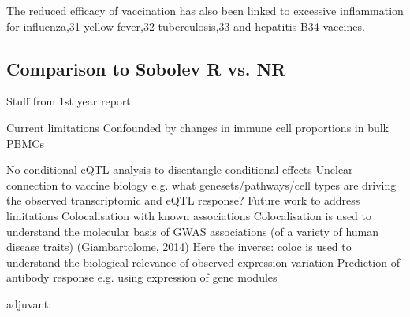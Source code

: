 The reduced efficacy of vaccination has also been linked to excessive inflammation for influenza,31 yellow fever,32 tuberculosis,33 and hepatitis B34 vaccines.

\subsection{Comparison to Sobolev R vs. NR}

Stuff from 1st year report.

Current limitations
Confounded by changes in immune cell proportions in bulk PBMCs

No conditional eQTL analysis to disentangle conditional effects
Unclear connection to vaccine biology e.g. what genesets/pathways/cell types are driving the observed transcriptomic and eQTL response?
Future work to address limitations
Colocalisation with known associations
Colocalisation is used to understand the molecular basis of GWAS associations (of a variety of human disease traits) (Giambartolome, 2014)
Here the inverse: coloc is used to understand the biological relevance of observed expression variation
Prediction of antibody response e.g. using expression of gene modules

adjuvant:
